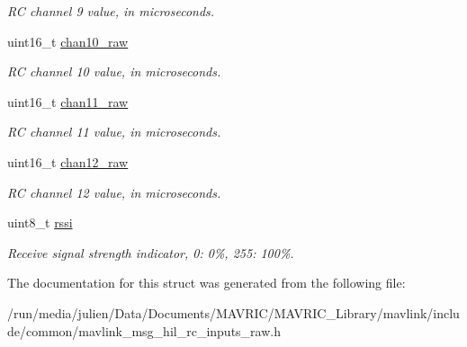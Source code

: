\begin{DoxyCompactItemize}
\begin{DoxyCompactList}\small\item\em R\+C channel 9 value, in microseconds. \end{DoxyCompactList}\item 
\hypertarget{struct____mavlink__hil__rc__inputs__raw__t_ac49fe649301c639a71ae5a5778934a3c}{uint16\+\_\+t \hyperlink{struct____mavlink__hil__rc__inputs__raw__t_ac49fe649301c639a71ae5a5778934a3c}{chan10\+\_\+raw}}\label{struct____mavlink__hil__rc__inputs__raw__t_ac49fe649301c639a71ae5a5778934a3c}

\begin{DoxyCompactList}\small\item\em R\+C channel 10 value, in microseconds. \end{DoxyCompactList}\item 
\hypertarget{struct____mavlink__hil__rc__inputs__raw__t_a09b92c1ec569948809c152e74bd61655}{uint16\+\_\+t \hyperlink{struct____mavlink__hil__rc__inputs__raw__t_a09b92c1ec569948809c152e74bd61655}{chan11\+\_\+raw}}\label{struct____mavlink__hil__rc__inputs__raw__t_a09b92c1ec569948809c152e74bd61655}

\begin{DoxyCompactList}\small\item\em R\+C channel 11 value, in microseconds. \end{DoxyCompactList}\item 
\hypertarget{struct____mavlink__hil__rc__inputs__raw__t_a5967e01d1c858a6136505185d183a99e}{uint16\+\_\+t \hyperlink{struct____mavlink__hil__rc__inputs__raw__t_a5967e01d1c858a6136505185d183a99e}{chan12\+\_\+raw}}\label{struct____mavlink__hil__rc__inputs__raw__t_a5967e01d1c858a6136505185d183a99e}

\begin{DoxyCompactList}\small\item\em R\+C channel 12 value, in microseconds. \end{DoxyCompactList}\item 
\hypertarget{struct____mavlink__hil__rc__inputs__raw__t_aa126d8b574a26544c57605c5aa1f8684}{uint8\+\_\+t \hyperlink{struct____mavlink__hil__rc__inputs__raw__t_aa126d8b574a26544c57605c5aa1f8684}{rssi}}\label{struct____mavlink__hil__rc__inputs__raw__t_aa126d8b574a26544c57605c5aa1f8684}

\begin{DoxyCompactList}\small\item\em Receive signal strength indicator, 0\+: 0\%, 255\+: 100\%. \end{DoxyCompactList}\end{DoxyCompactItemize}


The documentation for this struct was generated from the following file\+:\begin{DoxyCompactItemize}
\item 
/run/media/julien/\+Data/\+Documents/\+M\+A\+V\+R\+I\+C/\+M\+A\+V\+R\+I\+C\+\_\+\+Library/mavlink/include/common/mavlink\+\_\+msg\+\_\+hil\+\_\+rc\+\_\+inputs\+\_\+raw.\+h\end{DoxyCompactItemize}
